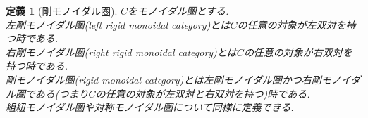 \documentclass[a4paper,12pt]{ltjsarticle}
\theoremstyle{break}
\newtheorem{defn}[thm]{定義}
\newcommand{\xr}[1]{\xrightarrow{#1}}
\newcommand{\id}{\mathrm{id}}
\newcommand{\al}{\alpha}
\newcommand{\la}{\lambda}
\newcommand{\ve}{\varepsilon}
\newcommand{\dav}{\dashv}
\newcommand{\ot}{\otimes}
\numberwithin{equation}{section}
\begin{document}

\begin{defn}[剛モノイダル圏]
  $C$をモノイダル圏とする. \\
  左剛モノイダル圏(left rigid monoidal category)とは$C$の任意の対象が左双対を持つ時である. \\
  右剛モノイダル圏(right rigid monoidal category)とは$C$の任意の対象が右双対を持つ時である. \\
  剛モノイダル圏(rigid monoidal category)とは左剛モノイダル圏かつ右剛モノイダル圏である(つまり$C$の任意の対象が左双対と右双対を持つ)時である. \\
  組紐モノイダル圏や対称モノイダル圏について同様に定義できる. 
\end{defn}
\end{document}
